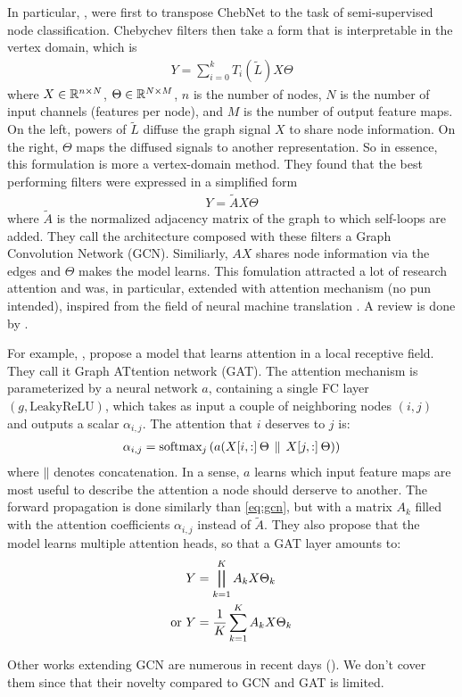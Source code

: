 In particular, \cite{kipf2016semi}, were first to transpose ChebNet to the task of semi-supervised node classification. Chebychev filters then take a form that is interpretable in the vertex domain, which is
\begin{gather}
Y = \displaystyle\sum_{i=0}^k T_i(\widetilde{L}) X \Theta
\end{gather}
where $X \in \bbr^{n \times N}$, $\Theta \in \bbr^{N \times M}$, $n$ is the number of nodes, $N$ is the number of input channels (features per node), and $M$ is the number of output feature maps. On the left, powers of $\widetilde{L}$ diffuse the graph signal $X$ to share node information. On the right, $\Theta$ maps the diffused signals to another representation. So in essence, this formulation is more a vertex-domain method. They found that the best performing filters were expressed in a simplified form
\begin{gather}
Y = \widetilde{A} X \Theta \label{eq:gcn}
\end{gather}
where $\widetilde{A}$ is the normalized adjacency matrix of the graph to which self-loops are added. They call the architecture composed with these filters a Graph Convolution Network (GCN). Similiarly, $AX$ shares node information via the edges and $\Theta$ makes the model learns. This fomulation attracted a lot of research attention and was, in particular, extended with attention mechanism (no pun intended), inspired from the field of neural machine translation \citep{bahdanau2014neural}. A review is done by \cite{lee2018attention}.

For example, \cite{velickovic2017graph}, propose a model that learns attention in a local receptive field. They call it Graph ATtention network (GAT). The attention mechanism is parameterized by a neural network $a$, containing a single FC layer $(g,\text{LeakyReLU})$, which takes as input a couple of neighboring nodes $(i,j)$ and outputs a scalar $\alpha_{i,j}$. The attention that $i$ deserves to $j$ is:
\begin{gather}
\alpha_{i,j} = \text{softmax}_j\left(a( X[i,:] \h{2} \Theta \h{2} \mathbin{\|} \h{2} X[j,:] \h{2} \Theta )\right)
\end{gather}
where $\mathbin{\|}$ denotes concatenation. In a sense, $a$ learns which input feature maps are most useful to describe the attention a node should derserve to another. The forward propagation is done similarly than \eqref{eq:gcn}, but with a matrix $A_k$ filled with the attention coefficients $\alpha_{i,j}$ instead of $\widetilde{A}$. They also propose that the model learns multiple attention heads, so that a GAT layer amounts to:
\begin{align}
Y &= \displaystyle\bigparallel_{k=1}^K A_k X \Theta_k\\
\text{or } Y &= \frac{1}K\displaystyle\sum_{k=1}^K A_k X \Theta_k
\end{align}

Other works extending GCN are numerous in recent days (\eg \cite{niepert2018towards}). We don't cover them since that their novelty compared to GCN and GAT is limited.
